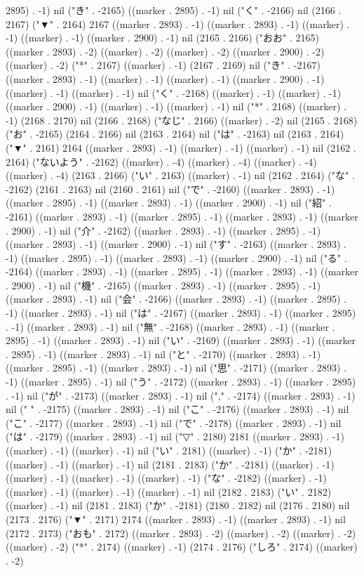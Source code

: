 2895) . -1) nil ("き" . -2165) ((marker . 2895) . -1) nil ("く" . -2166) nil (2166 . 2167) ("▼" . 2164) 2167 ((marker . 2893) . -1) ((marker . 2893) . -1) ((marker) . -1) ((marker) . -1) ((marker . 2900) . -1) nil (2165 . 2166) ("おお" . 2165) ((marker . 2893) . -2) ((marker) . -2) ((marker) . -2) ((marker . 2900) . -2) ((marker) . -2) ("*" . 2167) ((marker) . -1) (2167 . 2169) nil ("き" . -2167) ((marker . 2893) . -1) ((marker) . -1) ((marker) . -1) ((marker . 2900) . -1) ((marker) . -1) ((marker) . -1) nil ("く" . -2168) ((marker) . -1) ((marker) . -1) ((marker . 2900) . -1) ((marker) . -1) ((marker) . -1) nil ("*" . 2168) ((marker) . -1) (2168 . 2170) nil (2166 . 2168) ("なじ" . 2166) ((marker) . -2) nil (2165 . 2168) ("お" . -2165) (2164 . 2166) nil (2163 . 2164) nil ("は" . -2163) nil (2163 . 2164) ("▼" . 2161) 2164 ((marker . 2893) . -1) ((marker) . -1) ((marker) . -1) nil (2162 . 2164) ("ないよう" . -2162) ((marker) . -4) ((marker) . -4) ((marker) . -4) ((marker) . -4) (2163 . 2166) ("い" . 2163) ((marker) . -1) nil (2162 . 2164) ("な" . -2162) (2161 . 2163) nil (2160 . 2161) nil ("で" . -2160) ((marker . 2893) . -1) ((marker . 2895) . -1) ((marker . 2893) . -1) ((marker . 2900) . -1) nil ("紹" . -2161) ((marker . 2893) . -1) ((marker . 2895) . -1) ((marker . 2893) . -1) ((marker . 2900) . -1) nil ("介" . -2162) ((marker . 2893) . -1) ((marker . 2895) . -1) ((marker . 2893) . -1) ((marker . 2900) . -1) nil ("す" . -2163) ((marker . 2893) . -1) ((marker . 2895) . -1) ((marker . 2893) . -1) ((marker . 2900) . -1) nil ("る" . -2164) ((marker . 2893) . -1) ((marker . 2895) . -1) ((marker . 2893) . -1) ((marker . 2900) . -1) nil ("機" . -2165) ((marker . 2893) . -1) ((marker . 2895) . -1) ((marker . 2893) . -1) nil ("会" . -2166) ((marker . 2893) . -1) ((marker . 2895) . -1) ((marker . 2893) . -1) nil ("は" . -2167) ((marker . 2893) . -1) ((marker . 2895) . -1) ((marker . 2893) . -1) nil ("無" . -2168) ((marker . 2893) . -1) ((marker . 2895) . -1) ((marker . 2893) . -1) nil ("い" . -2169) ((marker . 2893) . -1) ((marker . 2895) . -1) ((marker . 2893) . -1) nil ("と" . -2170) ((marker . 2893) . -1) ((marker . 2895) . -1) ((marker . 2893) . -1) nil ("思" . -2171) ((marker . 2893) . -1) ((marker . 2895) . -1) nil ("う" . -2172) ((marker . 2893) . -1) ((marker . 2895) . -1) nil ("が" . -2173) ((marker . 2893) . -1) nil ("," . -2174) ((marker . 2893) . -1) nil (" " . -2175) ((marker . 2893) . -1) nil ("こ" . -2176) ((marker . 2893) . -1) nil ("こ" . -2177) ((marker . 2893) . -1) nil ("で" . -2178) ((marker . 2893) . -1) nil ("は" . -2179) ((marker . 2893) . -1) nil ("▽" . 2180) 2181 ((marker . 2893) . -1) ((marker) . -1) ((marker) . -1) nil ("い" . 2181) ((marker) . -1) ("か" . -2181) ((marker) . -1) ((marker) . -1) nil (2181 . 2183) ("か" . -2181) ((marker) . -1) ((marker) . -1) ((marker) . -1) ((marker) . -1) ("な" . -2182) ((marker) . -1) ((marker) . -1) ((marker) . -1) ((marker) . -1) nil (2182 . 2183) ("い" . 2182) ((marker) . -1) nil (2181 . 2183) ("か" . -2181) (2180 . 2182) nil (2176 . 2180) nil (2173 . 2176) ("▼" . 2171) 2174 ((marker . 2893) . -1) ((marker . 2893) . -1) nil (2172 . 2173) ("おも" . 2172) ((marker . 2893) . -2) ((marker) . -2) ((marker) . -2) ((marker) . -2) ("*" . 2174) ((marker) . -1) (2174 . 2176) ("しろ" . 2174) ((marker) . -2) 